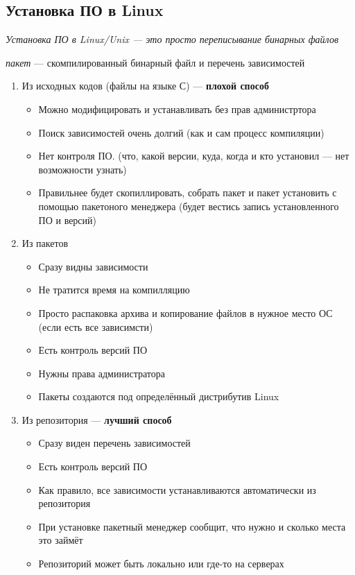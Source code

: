 \documentclass[oneside, final, 14pt]{extreport} %
\begin{document}
\subsection{Установка ПО в Linux}

\textit{Установка ПО в Linux/Unix --- это просто переписывание бинарных файлов}

\textit{пакет} --- скомпилированный бинарный файл и перечень зависимостей

\begin{enumerate}
    \item Из исходных кодов (файлы на языке С) --- \textbf{плохой способ}
     \begin{itemize}
        \item Можно модифицировать и устанавливать без прав администртора
        \item Поиск зависимостей очень долгий (как и сам процесс компиляции)
        \item Нет контроля ПО. (что, какой версии, куда, когда и кто установил --- нет возможности узнать)
        \item Правильнее будет скопиллировать, собрать пакет и пакет установить с помощью пакетоного менеджера (будет вестись запись установленного ПО и версий)
     \end{itemize}
    \item Из пакетов 
    \begin{itemize}
        \item Сразу видны зависимости
        \item Не тратится время на компилляцию 
        \item Просто распаковка архива и копирование файлов в нужное место ОС (если есть все  зависимсти)
        \item Есть контроль версий ПО 
        \item Нужны права администратора 
        \item Пакеты создаются под определённый дистрибутив Linux 
    \end{itemize}
    \item Из репозитория --- \textbf{лучший способ}
    \begin{itemize}
        \item Сразу виден перечень зависимостей 
        \item Есть контроль версий ПО 
        \item Как правило, все зависимости устанавливаются автоматически из репозитория
        \item При установке пакетный менеджер сообщит, что нужно и сколько места это займёт
        \item Репозиторий может быть локально или где-то на серверах
    \end{itemize}
\end{enumerate}
\end{document}

